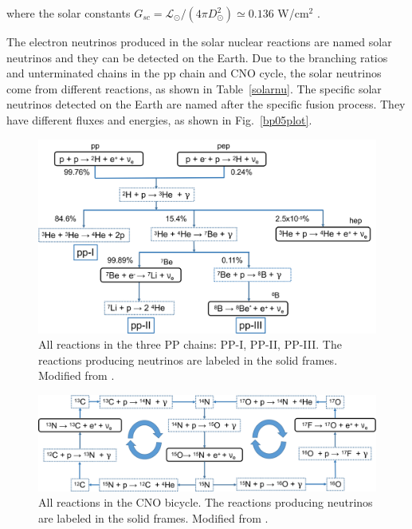 where the solar constants $G_{sc}=\mathcal{L}_\odot/(4\pi D^2_\odot)\simeq 0.136$ W/cm$^2$ \cite{suekane2015neutrino}. 

The electron neutrinos produced in the solar nuclear reactions are named solar neutrinos and they can be detected on the Earth. Due to the branching ratios and unterminated chains in the pp chain and CNO cycle, the solar neutrinos come from different reactions, as shown in Table~\ref{solarnu}. The specific solar neutrinos detected on the Earth are named after the specific fusion process\cite{haxton2013solar}. They have different fluxes and energies, as shown in Fig.~\ref{bp05plot}\cite{bahcall2005new}.

\begin{figure}[htbp]
	\centering	
	\includegraphics[width=14cm]{ppChain.png}
	\caption{All reactions in the three PP chains: PP-I, PP-II, PP-III. The reactions producing neutrinos are labeled in the solid frames. Modified from \cite{oberauer2020solar}.}
	\label{ppChain}
\end{figure}

\begin{figure}[htbp]
	\centering	
	\includegraphics[width=14cm]{CNOcycle.png}
	\caption{All reactions in the CNO bicycle. The reactions producing neutrinos are labeled in the solid frames. Modified from \cite{oberauer2020solar}.}
	\label{CNOcycle}
\end{figure}

